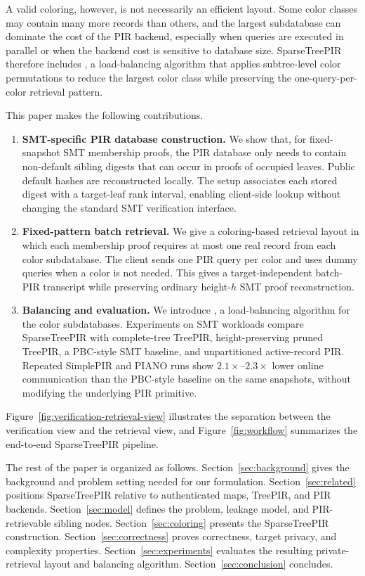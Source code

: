 A valid coloring, however, is not necessarily an efficient layout. Some color classes may contain many more records than others, and the largest subdatabase can dominate the cost of the PIR backend, especially when queries are executed in parallel or when the backend cost is sensitive to database size. SparseTreePIR therefore includes \ActiveBalance{}, a load-balancing algorithm that applies subtree-level color permutations to reduce the largest color class while preserving the one-query-per-color retrieval pattern.

This paper makes the following contributions.
\begin{enumerate}[leftmargin=2em]
	\item \textbf{SMT-specific PIR database construction.} We show that, for fixed-snapshot SMT membership proofs, the PIR database only needs to contain non-default sibling digests that can occur in proofs of occupied leaves. Public default hashes are reconstructed locally. The setup associates each stored digest with a target-leaf rank interval, enabling client-side lookup without changing the standard SMT verification interface.
	\item \textbf{Fixed-pattern batch retrieval.} We give a coloring-based retrieval layout in which each membership proof requires at most one real record from each color subdatabase. The client sends one PIR query per color and uses dummy queries when a color is not needed. This gives a target-independent batch-PIR transcript while preserving ordinary height-$h$ SMT proof reconstruction.
	\item \textbf{Balancing and evaluation.} We introduce \ActiveBalance{}, a load-balancing algorithm for the color subdatabases. Experiments on SMT workloads compare SparseTreePIR with complete-tree TreePIR, height-preserving pruned TreePIR, a PBC-style SMT baseline, and unpartitioned active-record PIR. Repeated SimplePIR and PIANO runs show $2.1\times$--$2.3\times$ lower online communication than the PBC-style baseline on the same snapshots, without modifying the underlying PIR primitive.
\end{enumerate}

Figure~\ref{fig:verification-retrieval-view} illustrates the separation between the verification view and the retrieval view, and Figure~\ref{fig:workflow} summarizes the end-to-end SparseTreePIR pipeline.

The rest of the paper is organized as follows. Section~\ref{sec:background} gives the background and problem setting needed for our formulation. Section~\ref{sec:related} positions SparseTreePIR relative to authenticated maps, TreePIR, and PIR backends. Section~\ref{sec:model} defines the problem, leakage model, and PIR-retrievable sibling nodes. Section~\ref{sec:coloring} presents the SparseTreePIR construction. Section~\ref{sec:correctness} proves correctness, target privacy, and complexity properties. Section~\ref{sec:experiments} evaluates the resulting private-retrieval layout and balancing algorithm. Section~\ref{sec:conclusion} concludes.

